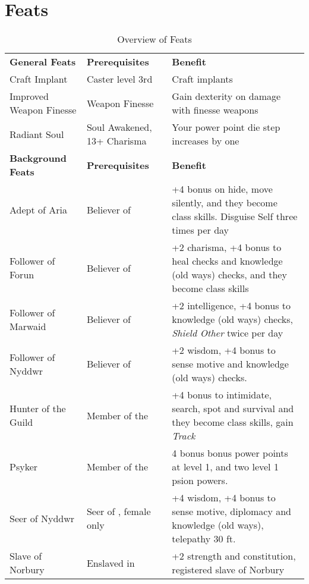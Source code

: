 \section{Feats}
\label{sec:Feats}

\begin{table*}[!htb]
  \caption{Overview of Feats}
  \begin{tabular}{l l p{7cm}}
    \textbf{General Feats}    & \textbf{Prerequisites}           & \textbf{Benefit} \\
    Craft Implant             & Caster level 3rd                 & Craft implants \\
    Improved Weapon Finesse   & Weapon Finesse                   & Gain dexterity on damage with finesse weapons \\
    Radiant Soul              & Soul Awakened, 13+ Charisma      & Your power point die step increases by one \\
    \textbf{Background Feats} & \textbf{Prerequisites}           & \textbf{Benefit} \\
    Adept of Aria             & Believer of \nameref{sec:Aria}   & +4 bonus on hide, move silently, and they become class skills. Disguise Self three times per day \\
    Follower of Forun         & Believer of \nameref{sec:Forun}  & +2 charisma, +4 bonus to heal checks and knowledge (old ways) checks, and they become class skills \\
    Follower of Marwaid       & Believer of \nameref{sec:Marwaid}& +2 intelligence, +4 bonus to knowledge (old ways) checks, \emph{Shield Other} twice per day \\
    Follower of Nyddwr        & Believer of \nameref{sec:Nyddwr} & +2 wisdom, +4 bonus to sense motive and knowledge (old ways) checks. \\
    Hunter of the Guild       & Member of the \nameref{sec:Hunters Guild} & +4 bonus to intimidate, search, spot and survival and they become class skills, gain \emph{Track} \\
    Psyker                    & Member of the \nameref{sec:Helemic Order} & 4 bonus bonus power points at level 1, and two level 1 psion powers. \\
    Seer of Nyddwr            & Seer of \nameref{sec:Nyddwr}, female only & +4 wisdom, +4 bonus to sense motive, diplomacy and knowledge (old ways), telepathy 30 ft. \\
    Slave of Norbury          & Enslaved in \nameref{sec:Norbury}& +2 strength and constitution, registered slave of Norbury \\

\end{tabular}
\end{table*}
